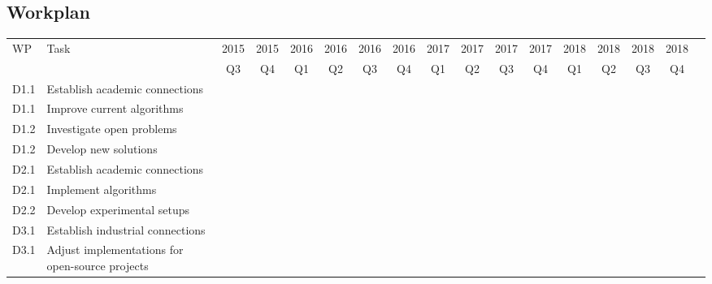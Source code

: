 \documentclass[a4paper,11pt]{article}
\begin{document}
    \newpage
    \begin{landscape}
    \section{Workplan}

    \begin{tabularx}{\linewidth}{|lX|c|c|c|c|c|c|c|c|c|c|c|c|c|c|c|}
        \hline
        \multirow{2}{*}{WP} & \multirow{2}{*}{Task} & 2015 & 2015 & 2016 & 2016 & 2016 & 2016 & 2017 & 2017 & 2017 & 2017 & 2018 & 2018 & 2018 & 2018 \\
        & & Q3 & Q4 & Q1 & Q2 & Q3 & Q4 & Q1 & Q2 & Q3 & Q4 & Q1 & Q2 & Q3 & Q4 \\\hline
        D1.1 & Establish academic connections & \cellcolor[gray]{0.5} & \cellcolor[gray]{0.5} & & & & & & & & & & & & \\\hline
        D1.1 & Improve current algorithms & \cellcolor[gray]{0.5} & \cellcolor[gray]{0.5} & \cellcolor[gray]{0.5} & \cellcolor[gray]{0.5} & \cellcolor[gray]{0.5} & \cellcolor[gray]{0.5} \cellcolor[gray]{0.5} & \cellcolor[gray]{0.5} & \cellcolor[gray]{0.5} & \cellcolor[gray]{0.5} & & & & & \\\hline
        D1.2 & Investigate open problems & & & & & & \cellcolor[gray]{0.5} & \cellcolor[gray]{0.5} & & & & & & & \\\hline
        D1.2 & Develop new solutions & & & & & & & \cellcolor[gray]{0.5} & \cellcolor[gray]{0.5} & \cellcolor[gray]{0.5} & \cellcolor[gray]{0.5} & \cellcolor[gray]{0.5} & \cellcolor[gray]{0.5} & \cellcolor[gray]{0.5} & \cellcolor[gray]{0.5} \\\hline
        D2.1 & Establish academic connections & \cellcolor[gray]{0.5} & \cellcolor[gray]{0.5} & & & & & & & & & & & & \\\hline
        D2.1 & Implement algorithms & \cellcolor[gray]{0.5} & \cellcolor[gray]{0.5} & \cellcolor[gray]{0.5} & \cellcolor[gray]{0.5} & \cellcolor[gray]{0.5} & \cellcolor[gray]{0.5} & \cellcolor[gray]{0.5} & \cellcolor[gray]{0.5} & & & & & & \\\hline
        D2.2 & Develop experimental setups & & & & & \cellcolor[gray]{0.5} & \cellcolor[gray]{0.5} & \cellcolor[gray]{0.5} & \cellcolor[gray]{0.5} & \cellcolor[gray]{0.5} & \cellcolor[gray]{0.5} & & & & \\\hline
        D3.1 & Establish industrial connections & & & & & & & \cellcolor[gray]{0.5} & \cellcolor[gray]{0.5} & \cellcolor[gray]{0.5} & & & & & \\\hline
        D3.1 & Adjust implementations for open-source projects & & & & & & & & & \cellcolor[gray]{0.5} & \cellcolor[gray]{0.5} & \cellcolor[gray]{0.5} & \cellcolor[gray]{0.5} & \cellcolor[gray]{0.5} & \\\hline
    \end{tabularx}


\end{landscape}
\end{document}
